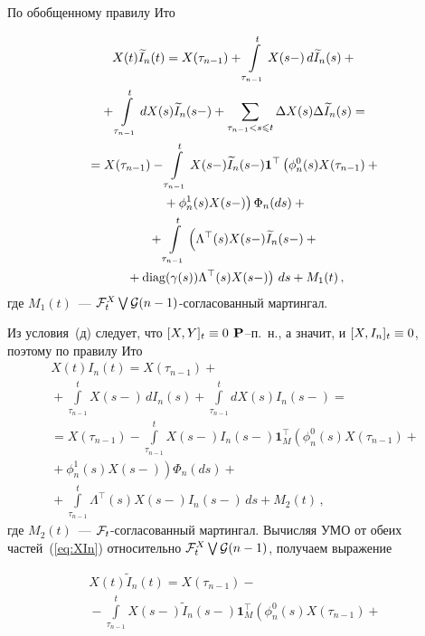 \begin{multicols}{2}
{По обобщенному правилу Ито

\noindent
\begin{multline}
 X(t)\widetilde{I}_n(t)=X(\tau_{n-1})+ \int\limits_{\tau_{n-1}}^{t}X(s-)\,
 d\widetilde{I}_n(s)+{} \\
 {}+
 \int\limits_{\tau_{n-1}}^{t}dX(s)\widetilde{I}_n(s-) +
 \sum\limits_{\tau_{n-1} < s \leqslant t} \Delta X(s)\Delta \widetilde{I}_n(s) ={}\\
{} =  X(\tau_{n-1}) - \int\limits_{\tau_{n-1}}^{t}
   X(s-)\widetilde{I}_n(s-)\mathbf{1}^{\top}\left(\phi^0_{n}(s)X(\tau_{n-1})+{}\right.\\
\left.   {}+
   \phi^1_{n}(s)X(s-)  \right) \Phi_{n}(ds)+ {}\\
   {}+ \int\limits_{\tau_{n-1}}^{t}\left( \Lambda^{\top}(s)X(s-)
   \widetilde{I}_n(s-) +{}\right.\\
\left.   {}+
 \mathop{\mathrm{diag}}(\gamma(s))\Lambda^{\top}(s)X(s-)
 \right)\,ds+M_1(t)\,,
 \label{eq:XwtIn_1}
 \end{multline}
 где $M_1(t)$~--- ${\mathcal F}_t^X \bigvee {\mathcal G}(n-1)$-со\-гла\-со\-ван\-ный мартингал.

 Из условия~(д) следует, что $[X,Y]_t \hm\equiv 0$ ${\mathbf P}$--п.~н., а
 значит, и $[X,I_n]_t \hm\equiv 0$, поэтому по правилу Ито
 \begin{multline}
 X(t)I_n(t)=X(\tau_{n-1})+{}\\
 {}+ \int\limits_{\tau_{n-1}}^{t}X(s-)\,dI_n(s)+
 \int\limits_{\tau_{n-1}}^{t}dX(s)I_n(s-)  ={}\\
{} =  X(\tau_{n-1}) - \int\limits_{\tau_{n-1}}^{t}
   X(s-)I_n(s-)\mathbf{1}_M^{\top}\left(\phi^0_{n}(s)X(\tau_{n-1})+{}\right.\\
\left.   {}+
   \phi^1_{n}(s)X(s-)  \right) \Phi_{n}(ds)+ {}\\
   {} + \int\limits_{\tau_{n-1}}^{t} \Lambda^{\top}(s)X(s-)I_n(s-)\, ds+M_2(t)\,,
 \label{eq:XIn}
 \end{multline}
 где $M_2(t)$~--- ${\mathcal F}_t$-со\-гла\-со\-ван\-ный мартингал. Вычисляя УМО
 от обеих частей~(\ref{eq:XIn}) относительно ${\mathcal F}_t^X \bigvee {\mathcal G}(n-1)$,
 получаем выражение

 \noindent
 \begin{multline*}
 X(t)\widetilde{I}_n(t)=
 X(\tau_{n-1}) -{} \\
 {}-\int\limits_{\tau_{n-1}}^{t}
   X(s-)\widetilde{I}_n(s-)\mathbf{1}_M^{\top}\left(\phi^0_{n}(s)
   X(\tau_{n-1})+{}\right.
   \end{multline*}

}
\end{multicols}
